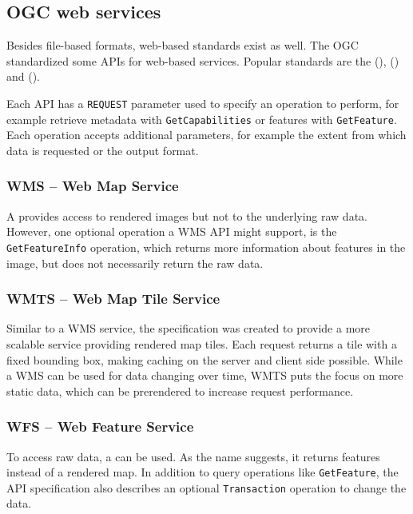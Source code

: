	\subsection{OGC web services}
	
		Besides file-based formats, web-based standards exist as well.
		The OGC standardized some APIs for web-based services.
		Popular standards are the  (),  () and  ().
		
		Each API has a \texttt{REQUEST} parameter used to specify an operation to perform, for example retrieve metadata with \texttt{GetCapabilities} or features with \texttt{GetFeature}.
		Each operation accepts additional parameters, for example the extent from which data is requested or the output format.
		
		\subsubsection{WMS -- Web Map Service}
		
			A  provides access to rendered images but not to the underlying raw data\cite{ogc-wms}.
			However, one optional operation a WMS API might support, is the \texttt{GetFeatureInfo} operation, which returns more information about features in the image, but does not necessarily return the raw data.
		
		\subsubsection{WMTS -- Web Map Tile Service}
		
			Similar to a WMS service, the  specification was created to provide a more scalable service providing rendered map tiles\cite{ogc-wmts}.
			Each request returns a tile with a fixed bounding box, making caching on the server and client side possible.
			While a WMS can be used for data changing over time, WMTS puts the focus on more static data, which can be prerendered to increase request performance.
		
		\subsubsection{WFS -- Web Feature Service}
		
			To access raw data, a  can be used\cite{ogc-wfs}.
			As the name suggests, it returns features instead of a rendered map.
			In addition to query operations like \texttt{GetFeature}, the API specification also describes an optional \texttt{Transaction} operation to change the data.
	
